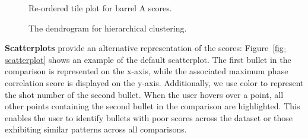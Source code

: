 \documentclass[
  12pt]{article}
\begin{document}
\begin{figure}


\caption{\label{fig-ClusteredMatrix}Re-ordered tile plot for barrel A
scores.}

\end{figure}%

\begin{figure}


\caption{\label{fig-dendrogram}The dendrogram for hierarchical
clustering.}

\end{figure}%

\textbf{Scatterplots} provide an alternative representation of the
scores: Figure~\ref{fig-scatterplot} shows an example of the default
scatterplot. The first bullet in the comparison is represented on the
x-axis, while the associated maximum phase correlation score is
displayed on the y-axis. Additionally, we use color to represent the
shot number of the second bullet. When the user hovers over a point, all
other points containing the second bullet in the comparison are
highlighted. This enables the user to identify bullets with poor scores
across the dataset or those exhibiting similar patterns across all
comparisons.
\end{document}
